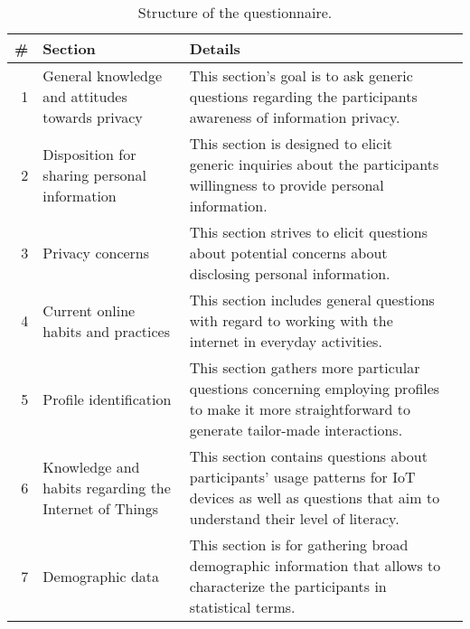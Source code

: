 \begin{table}[H]
    \begin{center}
        \caption{Structure of the questionnaire.}
        \label{table:questionnaire}
        \vspace{1em}
        \begin{tabular}{r *{3}{ p{6cm} }}
            \hline
            \textbf{\#}\hspace{0.5cm} & \textbf{Section} & \textbf{Details} \\
            \hline
            1\hspace{0.5cm} & General knowledge and attitudes towards privacy & This
            section's goal is to ask generic questions regarding the participants awareness
            of information privacy. \\
            \hline
            2\hspace{0.5cm} & Disposition for sharing personal information & This
            section is designed to elicit generic inquiries about the participants
            willingness to provide personal information. \\
            \hline
            3\hspace{0.5cm} & Privacy concerns & This section strives to
            elicit questions about potential concerns about disclosing
            personal information. \\
            \hline
            4\hspace{0.5cm} & Current online habits and practices & This
            section includes general questions with regard to working with
            the internet in everyday activities. \\
            \hline
            5\hspace{0.5cm} & Profile identification & This section gathers
            more particular questions concerning employing profiles to make
            it more straightforward to generate tailor-made interactions. \\
            \hline
            6\hspace{0.5cm} & Knowledge and habits regarding the Internet
            of Things & This section contains questions about participants'
            usage patterns for IoT devices as well as questions that aim to
            understand their level of literacy. \\
            \hline
            7\hspace{0.5cm} & Demographic data & This section is for
            gathering broad demographic information that allows
            to characterize the participants in statistical terms. \\
            \hline
        \end{tabular}
    \end{center}
\end{table}

